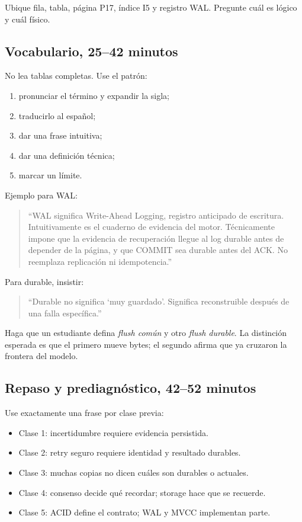 \documentclass[variant=docente,cover=institutional,mode=screen]{ua-engineering-v6-article}
\begin{document}
Ubique fila, tabla, página P17, índice I5 y registro WAL. Pregunte cuál es lógico y cuál físico.

\subsection{Vocabulario, 25--42 minutos}

No lea tablas completas. Use el patrón:

\begin{enumerate}
\item pronunciar el término y expandir la sigla;
\item traducirlo al español;
\item dar una frase intuitiva;
\item dar una definición técnica;
\item marcar un límite.
\end{enumerate}

Ejemplo para WAL:

\begin{quote}
``WAL significa Write-Ahead Logging, registro anticipado de escritura. Intuitivamente es el cuaderno de evidencia del motor. Técnicamente impone que la evidencia de recuperación llegue al log durable antes de depender de la página, y que COMMIT sea durable antes del ACK. No reemplaza replicación ni idempotencia.''
\end{quote}

Para durable, insistir:

\begin{quote}
``Durable no significa `muy guardado'. Significa reconstruible después de una falla específica.''
\end{quote}

Haga que un estudiante defina \emph{flush común} y otro \emph{flush durable}. La distinción esperada es que el primero mueve bytes; el segundo afirma que ya cruzaron la frontera del modelo.

\subsection{Repaso y prediagnóstico, 42--52 minutos}

Use exactamente una frase por clase previa:

\begin{itemize}
\item Clase 1: incertidumbre requiere evidencia persistida.
\item Clase 2: retry seguro requiere identidad y resultado durables.
\item Clase 3: muchas copias no dicen cuáles son durables o actuales.
\item Clase 4: consenso decide qué recordar; storage hace que se recuerde.
\item Clase 5: ACID define el contrato; WAL y MVCC implementan parte.
\end{itemize}
\end{document}
